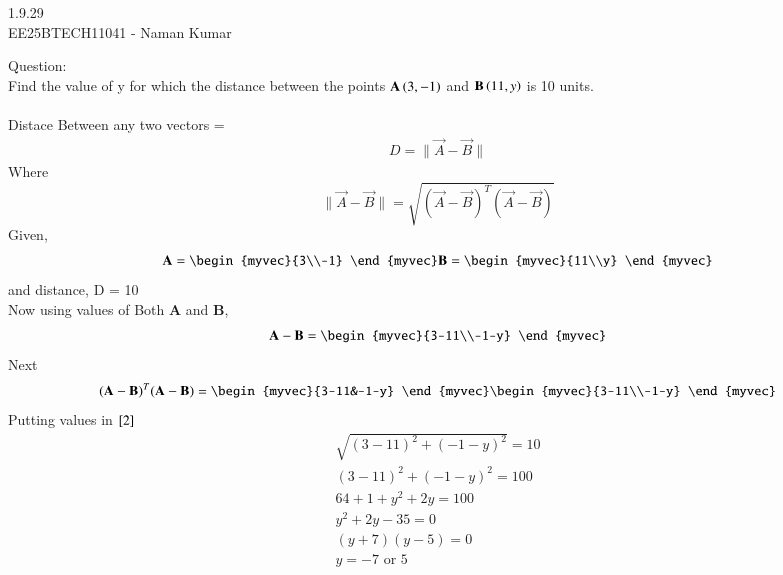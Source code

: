 \documentclass[journal]{IEEEtran}
\author{EE25BTECH11041-Naman Kumar }
\begin{document}
\begin{center}
    \huge{1.9.29}\\
    \large{EE25BTECH11041 - Naman Kumar}
\end{center}
Question:\\
Find the value of y for which the distance between the points $\Vec{A}\brak{3,-1}$ and $\Vec{B}\brak{11,y}$ is 10 units.\\
\solution \\
Distace Between any two vectors = 
\begin{align}
D= \lVert \vec{A}-\vec{B}\rVert
\end{align}
Where
\begin{equation}
\lVert \vec{A}-\vec{B}\rVert=\sqrt{(\vec{A}-\vec{B})^{T}(\vec{A}-\vec{B})} \label{2}
\end{equation}
Given,
\begin{align}
    \vec{A}=\begin{myvec}{3\\-1} \end{myvec}
    \vec{B}=\begin{myvec}{11\\y} \end{myvec}
\end{align}
and distance, D = 10\\
Now using values of Both \textbf{A} and \textbf{B},
\begin{align}
    \vec{A}-\vec{B}=\begin{myvec}{3-11\\-1-y} \end{myvec}
\end{align}
Next
\begin{align}
    (\vec{A}-\vec{B})^{T}(\vec{A}-\vec{B}) = \begin{myvec}{3-11&-1-y} \end{myvec} \begin{myvec}{3-11\\-1-y} \end{myvec}
\end{align}
Putting values in $\eqref{2}$
\begin{align}
    \sqrt{(3-11)^2+(-1-y)^2}=10\\
    (3-11)^2+(-1-y)^2=100\\
    64+1+y^2+2y=100\\
    y^2+2y-35=0\\
    (y+7)(y-5)=0\\
    y=-7 \text{ or } 5 
\end{align}
\end{document}
